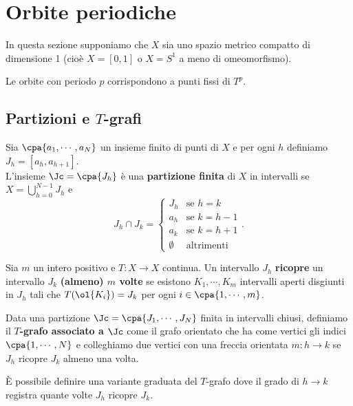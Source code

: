 \chapter{Orbite periodiche}
In questa sezione supponiamo che  $X$ sia uno spazio metrico compatto di dimensione 1 (cio\`e $X=[0,1]$ o $X=S^1$ a meno di omeomorfismo).

\begin{remark}
Le orbite con periodo $p$ corrispondono a punti fissi di $T^p$.
\end{remark}

\section{\texorpdfstring{Partizioni e $T$-grafi}{Partizioni e T-grafi}}
\begin{definition}
Sia $\cpa{a_1,\cdots, a_N}$ un insieme finito di punti di $X$ e per ogni $h$ definiamo $J_h=[a_h,a_{h+1}]$.\\ L'insieme $\Jc=\cpa{J_h}$ \`e una \textbf{partizione finita} di $X$ in intervalli se $X=\bigcup_{h=0}^{N-1}J_h$ e 
\[J_h\cap J_k=\begin{cases}
J_h & \text{se }h=k\\
a_{h} & \text{se }k=h-1\\
a_{k} & \text{se }k=h+1\\
\emptyset &\text{altrimenti}
\end{cases}.\] 
\end{definition}

\begin{definition}
Sia $m$ un intero positivo e $T:X\to X$ continua. Un intervallo $J_h$ \textbf{ricopre} un intervallo $J_k$ \textbf{(almeno) $m$ volte} se esistono $K_1,\cdots, K_m$ intervalli aperti disgiunti in $J_h$ tali che $T(\ol{K_i})=J_k$ per ogni $i\in\cpa{1,\cdots, m}$.
\end{definition}

\begin{definition}
Data una partizione $\Jc=\cpa{J_1,\cdots, J_N}$ finita in intervalli chiusi, definiamo il \textbf{$T$-grafo associato a $\Jc$} come il grafo orientato che ha come vertici gli indici $\cpa{1,\cdots, N}$ e colleghiamo due vertici con una freccia orientata $m:h\to k$ se $J_h$ ricopre $J_k$ almeno una volta.
\end{definition}
\begin{remark}
\`E possibile definire una variante graduata del $T$-grafo dove il grado di $h\to k$ registra quante volte $J_h$ ricopre $J_k$.
\end{remark}

